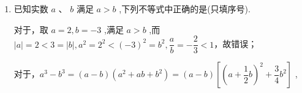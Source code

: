 \begin{enumerate}
\begin{jieda}
        所以 “ $x > 0,y > 0$ ” 是 “ ${xy} > 0$ ” 的充分不必要条件；
        
        由 $x \neq  0$ 可得 ${x}^{2} + {y}^{2} > 0$
        
        由 ${x}^{2} + {y}^{2} > 0$ ,得 $x \neq  0$ 或 $y \neq  0$
        
        所以 “ ${x}^{2} + {y}^{2} > 0$ ” 是 “ $x \neq  0$ ” 的必要不充分条件.
    \end{jieda}
    \item 已知实数 $a$ 、 $b$ 满足 $a > b$ ,下列不等式中正确的是(只填序号).
    \begin{jieda}
        对于，取 $a = 2,b =  - 3$ ,满足 $a > b$ ,而$\left| a\right|  = 2 < 3 = \left| b\right| ,{a}^{2} = {2}^{2} < {\left( -3\right) }^{2} = {b}^{2},\dfrac{a}{b} =  - \dfrac{2}{3} < 1$，故错误；

        对于，${a}^{3} - {b}^{3} = \left( {a - b}\right) \left( {{a}^{2} + {ab} + {b}^{2}}\right)  = \left( {a - b}\right) \left\lbrack  {{\left( a + \dfrac{1}{2}b\right) }^{2} + \dfrac{3}{4}{b}^{2}}\right\rbrack$ ,


\end{jieda}
\end{enumerate}
